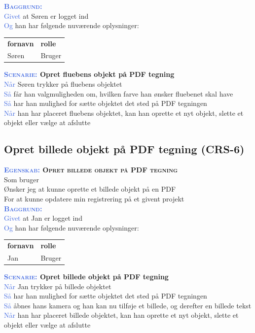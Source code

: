 \textsc{\textcolor{RoyalBlue}{\textbf{Baggrund:}}}\\
\textcolor{RoyalBlue}{Givet} at Søren er logget ind\\
\textcolor{RoyalBlue}{Og} han har følgende nuværende oplysninger:\\
\begin{tabular}{| l | l |}
	\textbf{fornavn} & \textbf{rolle} \\
	Søren & Bruger\\
\end{tabular}

\textbf{\textsc{\textcolor{RoyalBlue}{Scenarie:}} Opret fluebens objekt på PDF tegning}\\
\textcolor{RoyalBlue}{Når} Søren trykker på fluebens objektet\\
\textcolor{RoyalBlue}{Så}  får han valgmuligheden om, hvilken farve han ønsker fluebenet skal have\\
\textcolor{RoyalBlue}{Så}  har han mulighed for sætte objektet det sted på PDF tegningen\\
\textcolor{RoyalBlue}{Når} han har placeret fluebens objektet, kan han oprette et nyt objekt, slette et objekt eller vælge at afslutte \\

\subsection{Opret billede objekt på PDF tegning (CRS-6)} \label{sec:USOpretBillede}
\textbf{\textsc{\textcolor{RoyalBlue}{Egenskab:} Opret billede objekt på PDF tegning}}\\
Som bruger\\
Ønsker jeg at kunne oprette et billede objekt på en PDF\\
For at kunne opdatere min registrering på et givent projekt \\

\textsc{\textcolor{RoyalBlue}{\textbf{Baggrund:}}}\\
\textcolor{RoyalBlue}{Givet} at Jan er logget ind\\
\textcolor{RoyalBlue}{Og} han har følgende nuværende oplysninger:\\
\begin{tabular}{| l | l |}
	\textbf{fornavn} & \textbf{rolle} \\
	Jan & Bruger\\
\end{tabular}

\textbf{\textsc{\textcolor{RoyalBlue}{Scenarie:}} Opret billede objekt på PDF tegning}\\
\textcolor{RoyalBlue}{Når} Jan trykker på billede objektet\\
\textcolor{RoyalBlue}{Så}  har han mulighed for sætte objektet det sted på PDF tegningen\\
\textcolor{RoyalBlue}{Så}  åbnes hans kamera og han kan nu tilføje et billede, og derefter en billede tekst\\
\textcolor{RoyalBlue}{Når} han har placeret billede objektet, kan han oprette et nyt objekt, slette et objekt eller vælge at afslutte \\

